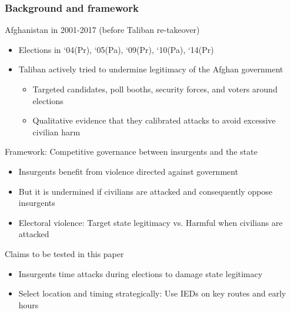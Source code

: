 \documentclass[aspectratio=169]{beamer}
\begin{document}
\begin{frame}
\frametitle{Background and framework} 
Afghanistan in 2001-2017 (before Taliban re-takeover)
\begin{itemize}\setlength\itemsep{3pt}
\item Elections in `04(Pr), `05(Pa), `09(Pr), `10(Pa), `14(Pr) 
\item Taliban actively tried to undermine legitimacy of the Afghan government
\begin{itemize}\setlength\itemsep{3pt}
  \item Targeted candidates, poll booths, security forces, and voters around elections
  \item Qualitative evidence that they calibrated attacks to avoid excessive civilian harm
\end{itemize}
\end{itemize}\medskip
Framework: Competitive governance between insurgents and the state
\begin{itemize}\setlength\itemsep{3pt}
\item Insurgents benefit from violence directed against government
\item But it is undermined if civilians are attacked and consequently
oppose insurgents
\item Electoral violence: Target state legitimacy vs. Harmful when civilians are attacked
\end{itemize} \medskip
Claims to be tested in this paper
\begin{itemize}\setlength\itemsep{3pt}
\item Insurgents time attacks during elections to damage state legitimacy
\item Select location and timing strategically: Use IEDs on key routes and early hours
\end{itemize}
\end{frame}
\end{document}
